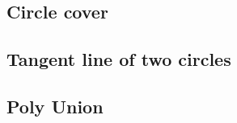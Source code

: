 \documentclass[a4paper,10pt,twocolumn,oneside]{article}
\begin{document}
%

%

\subsection{Circle cover}


%

\subsection{Tangent line of two circles}



% 

%
%

\subsection{Poly Union}


%
\end{document}
